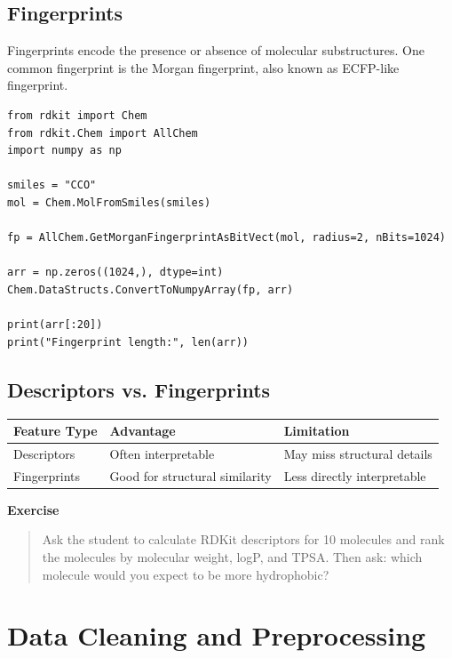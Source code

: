 \documentclass[11pt]{report}
\newenvironment{Important note}{\begin{quote}\color{red}\textbf{Important note:} }{\end{quote}}
\newenvironment{exercise}
{\vspace{0.5em}\noindent\textbf{Exercise}\begin{quote}}
{\end{quote}\vspace{0.5em}}
\begin{document}
\section{Fingerprints}

Fingerprints encode the presence or absence of molecular substructures. One common fingerprint is the Morgan fingerprint, also known as ECFP-like fingerprint.

\begin{lstlisting}[style=pythonstyle, caption={Calculating a Morgan fingerprint.}]
from rdkit import Chem
from rdkit.Chem import AllChem
import numpy as np

smiles = "CCO"
mol = Chem.MolFromSmiles(smiles)

fp = AllChem.GetMorganFingerprintAsBitVect(mol, radius=2, nBits=1024)

arr = np.zeros((1024,), dtype=int)
Chem.DataStructs.ConvertToNumpyArray(fp, arr)

print(arr[:20])
print("Fingerprint length:", len(arr))
\end{lstlisting}

\section{Descriptors vs. Fingerprints}

\begin{center}
\begin{tabular}{lll}
\toprule
\textbf{Feature Type} & \textbf{Advantage} & \textbf{Limitation} \\
\midrule
Descriptors & Often interpretable & May miss structural details \\
Fingerprints & Good for structural similarity & Less directly interpretable \\
\bottomrule
\end{tabular}
\end{center}

\begin{exercise}
Ask the student to calculate RDKit descriptors for 10 molecules and rank the molecules by molecular weight, logP, and TPSA. Then ask: which molecule would you expect to be more hydrophobic?
\end{exercise}

\chapter{Data Cleaning and Preprocessing}
\end{document}
